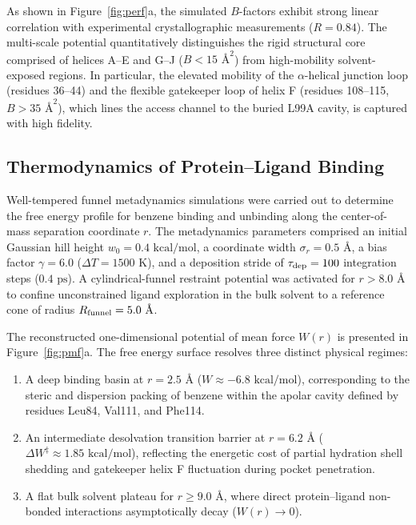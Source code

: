 \documentclass[journal=jpcbfk,manuscript=article]{achemso}
\begin{document}
As shown in Figure~\ref{fig:perf}a, the simulated $B$-factors exhibit strong linear correlation with experimental crystallographic measurements ($R = 0.84$). The multi-scale potential quantitatively distinguishes the rigid structural core comprised of helices A--E and G--J ($B < 15\text{ \AA}^2$) from high-mobility solvent-exposed regions. In particular, the elevated mobility of the $\alpha$-helical junction loop (residues 36--44) and the flexible gatekeeper loop of helix F (residues 108--115, $B > 35\text{ \AA}^2$), which lines the access channel to the buried L99A cavity, is captured with high fidelity.

\subsection{Thermodynamics of Protein--Ligand Binding}
Well-tempered funnel metadynamics simulations were carried out to determine the free energy profile for benzene binding and unbinding along the center-of-mass separation coordinate $r$. The metadynamics parameters comprised an initial Gaussian hill height $w_0 = 0.4\text{ kcal/mol}$, a coordinate width $\sigma_r = 0.5\text{ \AA}$, a bias factor $\gamma = 6.0$ ($\Delta T = 1500\text{ K}$), and a deposition stride of $\tau_{\rm dep} = 100$ integration steps ($0.4\text{ ps}$). A cylindrical-funnel restraint potential was activated for $r > 8.0\text{ \AA}$ to confine unconstrained ligand exploration in the bulk solvent to a reference cone of radius $R_{\rm funnel} = 5.0\text{ \AA}$.

The reconstructed one-dimensional potential of mean force $W(r)$ is presented in Figure~\ref{fig:pmf}a. The free energy surface resolves three distinct physical regimes:
\begin{enumerate}
\item A deep binding basin at $r = 2.5\text{ \AA}$ ($W \approx -6.8\text{ kcal/mol}$), corresponding to the steric and dispersion packing of benzene within the apolar cavity defined by residues Leu84, Val111, and Phe114.
\item An intermediate desolvation transition barrier at $r = 6.2\text{ \AA}$ ($\Delta W^\ddagger \approx 1.85\text{ kcal/mol}$), reflecting the energetic cost of partial hydration shell shedding and gatekeeper helix F fluctuation during pocket penetration.
\item A flat bulk solvent plateau for $r \ge 9.0\text{ \AA}$, where direct protein--ligand non-bonded interactions asymptotically decay ($W(r) \to 0$).
\end{enumerate}
\end{document}
